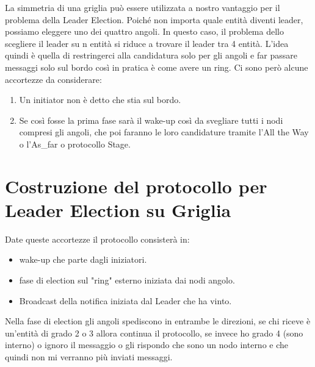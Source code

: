 La simmetria di una griglia può essere utilizzata a nostro vantaggio per il
problema della Leader Election. Poiché non importa quale entità diventi leader,
possiamo eleggere uno dei quattro angoli. In questo caso, il problema dello
scegliere il leader su n entità si riduce a trovare il leader tra 4 entità.
L'idea quindi è quella di restringerci alla candidatura solo per gli angoli e
far passare messaggi solo sul bordo così in pratica è come avere un ring. Ci
sono però alcune accortezze da considerare:
\begin{enumerate}
    \item Un initiator non è detto che stia sul bordo.
    \item Se così fosse la prima fase sarà il wake-up così da svegliare tutti i
          nodi compresi gli angoli, che poi faranno le loro candidature tramite l'All
          the Way o l'As\_far o protocollo Stage.
\end{enumerate}
\section{Costruzione del protocollo per Leader Election su Griglia}
Date queste accortezze il protocollo consisterà in:
\begin{itemize}
    \item wake-up che parte dagli iniziatori.
    \item fase di election sul "ring" esterno iniziata dai nodi angolo.
    \item Broadcast della notifica iniziata dal Leader che ha vinto.
\end{itemize}
Nella fase di election gli angoli spediscono in entrambe le direzioni, se chi
riceve è un'entità di grado 2 o 3 allora continua il protocollo, se invece ho
grado 4 (sono interno) o ignoro il messaggio o gli rispondo che sono un nodo
interno e che quindi non mi verranno più inviati messaggi.\\
